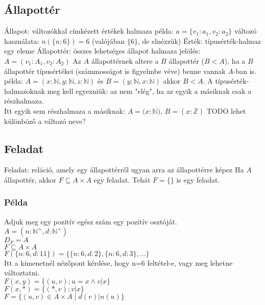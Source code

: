 \documentclass[12pt,a4paper]{article}
\begin{document}
\subsection{Állapottér}

\begin{outline}
	\1 Állapot: változókkal címkézett értékek halmaza
		\2 példa: $a=\{ v_1:a_1, v_2:a_2 \}$
		\2 változó használata: $n(\{n:6\})=6$ (valójában $\{6\}$, de elnézzük)
	\1 Érték: típusérték-halmaz egy eleme
	\1 Állapottér: összes lehetséges állapot halmaza
		\2 jelölés: $A=( v_1:A_1, v_2:A_2 )$
	\1 Az $A$ állapottérnek altere a $B$ állapottér ($B<A$),
	ha a $B$ állapottér típusértékei (számmosságot is figyelmbe véve) benne vannak $A$-ban is.
		\2 példa: $A=(x:\mathbb{N},y:\mathbb{N},z:\mathbb{N})$
		és $B=(y:\mathbb{N},x:\mathbb{N})$ akkor $B<A$.
		\2 A típusérték-halmazoknak meg kell egyezniük: az nem "elég",
		ha az egyik a másiknak csak a  részhalmaza. \\
		Itt egyik sem részhalmaza a másiknak: $A=(x:\mathbb{N)}$, $B=(x:\mathbb{Z})$
		\2 TODO lehet különböző a változó neve?
\end{outline}

\subsection{Feladat}

\begin{outline}
	\1 Feladat: reláció, amely egy állapottérről ugyan arra az állapottérre képez
		\2 Ha $A$ állapottér, akkor $F \subseteq A \times A$ egy feladat.
		\2 Tehát $F=\{\}$ is egy feladat.
\end{outline}

\subsubsection{Példa}

Adjuk meg egy pozitív egész szám egy pozitív osztóját. \\
$A=( n:\mathbb{N}^+, d:\mathbb{N}^+ )$ \\
$D_F = A$ \\
$F \subseteq A \times A$ \\
$F(\{n:6,d:11\}) = \{ \{n:6,d:2\}, \{n:6,d:3\}, ... \} $ \\
Itt a kimenetnél nézőpont kérdése, hogy n=6 feltétel-e, vagy meg lehetne változtatni. \\
$F(x,y)=\{(u,v) ; u=x \wedge v|x\}$ \\
$F(x,*)=\{(*,v) ; v|x\}$ \\
$F = \{(u,v) \in A \times A \;|\; d(v)|n(u) \}$
\end{document}
